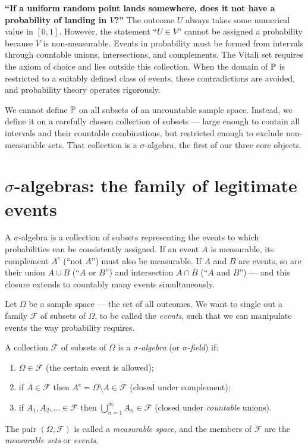 \begin{paradoxbox}
\textbf{``If a uniform random point lands somewhere, does it not have a probability of landing in $V$?''}
The outcome $U$ always takes some numerical value in $[0,1]$. However, the statement
``$U \in V$'' cannot be assigned a probability because $V$ is non-measurable.
Events in probability must be formed from intervals through countable unions,
intersections, and complements. The Vitali set requires the axiom of choice and lies
outside this collection. When the domain of $\P$ is restricted to a suitably defined
class of events, these contradictions are avoided, and probability theory operates rigorously.
\end{paradoxbox}

We cannot define $\P$ on all subsets of an uncountable sample space.
Instead, we define it on a carefully chosen collection of subsets --- large enough to
contain all intervals and their countable combinations, but restricted enough to exclude
non-measurable sets. That collection is a $\sigma$-algebra, the first of our three core objects.

\section{$\sigma$-algebras: the family of legitimate events}
\label{ch36:sigma-algebra}

\begin{intuitionbox}
A $\sigma$-algebra is a collection of subsets representing the events to which
probabilities can be consistently assigned. If an event $A$ is measurable, its
complement $A^c$ (``not $A$'') must also be measurable. If $A$ and $B$ are events,
so are their union $A \cup B$ (``$A$ or $B$'') and intersection $A \cap B$ (``$A$ and $B$'')
--- and this closure extends to countably many events simultaneously.
\end{intuitionbox}

Let $\Omega$ be a sample space --- the set of all outcomes. We want to single out
a family $\mathcal{F}$ of subsets of $\Omega$, to be called the \emph{events},
such that we can manipulate events the way probability requires.

\begin{definition}
\label{ch36:sigma-def}
A collection $\mathcal{F}$ of subsets of $\Omega$ is a \emph{$\sigma$-algebra} (or
\emph{$\sigma$-field}) if:
\begin{enumerate}
  \item $\Omega \in \mathcal{F}$ \quad(the certain event is allowed);
  \item if $A \in \mathcal{F}$ then $A^c = \Omega \setminus A \in \mathcal{F}$
        \quad(closed under complement);
  \item if $A_1, A_2, \dots \in \mathcal{F}$ then
        $\bigcup_{n=1}^{\infty} A_n \in \mathcal{F}$
        \quad(closed under \emph{countable} unions).
\end{enumerate}
The pair $(\Omega, \mathcal{F})$ is called a \emph{measurable space}, and the
members of $\mathcal{F}$ are the \emph{measurable sets} or \emph{events}.
\end{definition}

